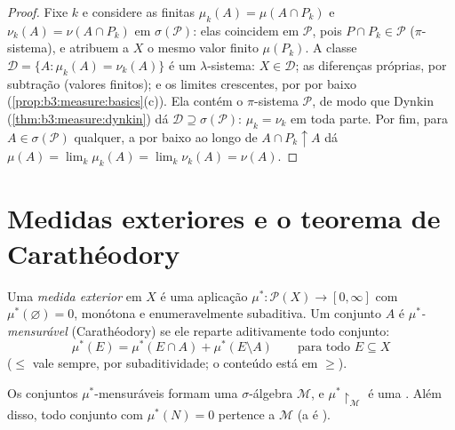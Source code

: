 \begin{proof}
Fixe $k$ e considere as  finitas $\mu_k(A) = \mu(A \cap
P_k)$ e $\nu_k(A) = \nu(A \cap P_k)$ em $\sigma(\mathcal
P)$: elas
coincidem em $\mathcal P$, pois $P \cap P_k \in \mathcal
P$ ($\pi$-sistema), e atribuem a $X$
o mesmo valor finito $\mu(P_k)$. A classe $\mathcal D = \{A : \mu_k(A) =
\nu_k(A)\}$ é um $\lambda$-sistema: $X \in \mathcal D$; as
diferenças próprias, por subtração (valores finitos); e os limites
crescentes, por  por baixo (\cref{prop:b3:measure:basics}(c)). Ela contém
o $\pi$-sistema $\mathcal P$, de modo que Dynkin (\cref{thm:b3:measure:dynkin}) dá $\mathcal D \supseteq
\sigma(\mathcal P)$:
$\mu_k = \nu_k$ em toda parte. Por fim, para $A \in \sigma(\mathcal P)$ qualquer, a  por
baixo ao longo de $A
\cap P_k \uparrow A$ dá $\mu(A) = \lim_k\mu_k(A) =
\lim_k\nu_k(A) = \nu(A)$.
\end{proof}

\section{Medidas exteriores e o teorema de Carathéodory}

\begin{definition}\label{def:b3:measure:outer}
Uma \emph{medida exterior} em $X$ é uma
aplicação $\mu^* \colon \mathcal P(X) \to [0, \infty]$ com $\mu^*(\varnothing) = 0$, monótona e enumeravelmente subaditiva. Um
conjunto $A$ é \emph{$\mu^*$-mensurável} (Carathéodory) se ele
reparte aditivamente todo conjunto:
\[
\mu^*(E) = \mu^*(E \cap A) + \mu^*(E \setminus A)
\qquad \text{para todo } E \subseteq X
\]
($\leq$ vale sempre, por subaditividade; o conteúdo está em
$\geq$).
\end{definition}

\begin{theorem}[Carathéodory]\label{thm:b3:measure:caratheodory}
Os conjuntos $\mu^*$-mensuráveis formam uma $\sigma$-álgebra
$\mathcal
M$, e $\mu^*\restriction_{\mathcal M}$ é uma . Além disso, todo conjunto com $\mu^*(N) = 0$ pertence
a $\mathcal M$ (a  é \emph{}).
\end{theorem}

